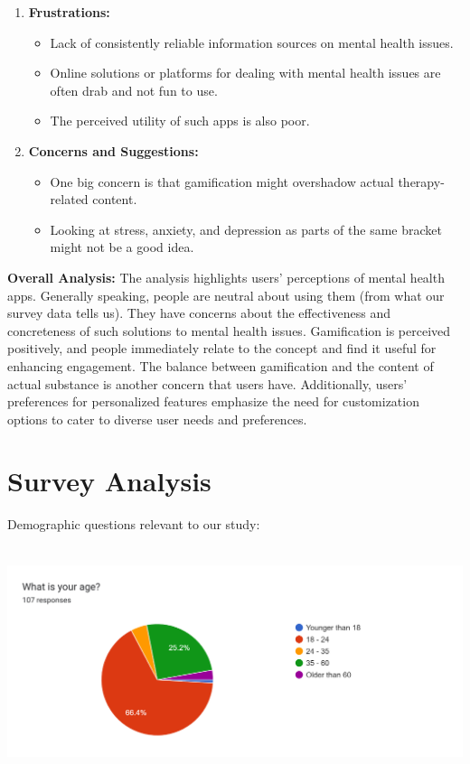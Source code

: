 \documentclass[manuscript,screen,review]{acmart}
\begin{document}
\begin{enumerate}
    \item \textbf{Frustrations:}
    \begin{itemize}
        \item Lack of consistently reliable information sources on mental health issues.
        \item Online solutions or platforms for dealing with mental health issues are often drab and not fun to use.
        \item The perceived utility of such apps is also poor.
    \end{itemize}
    
    \item \textbf{Concerns and Suggestions:}
    \begin{itemize}
        \item One big concern is that gamification might overshadow actual therapy-related content.
        \item Looking at stress, anxiety, and depression as parts of the same bracket might not be a good idea.
    \end{itemize}
\end{enumerate}
\newline
\textbf{Overall Analysis:} The analysis highlights users' perceptions of mental health apps. Generally speaking, people are neutral about using them (from what our survey data tells us). They have concerns about the effectiveness and concreteness of such solutions to mental health issues. Gamification is perceived positively, and people immediately relate to the concept and find it useful for enhancing engagement. The balance between gamification and the content of actual substance is another concern that users have. Additionally, users' preferences for personalized features emphasize the need for customization options to cater to diverse user needs and preferences.




\section{Survey Analysis}

Demographic questions relevant to our study:

\includegraphics[width=6.26806in,height=2.63889in]{vertopal.com_Survey analysis/vertopal_0d4ab446a1ae41f4824d7f0aaede9ca1/media/image1.png}
\end{document}
